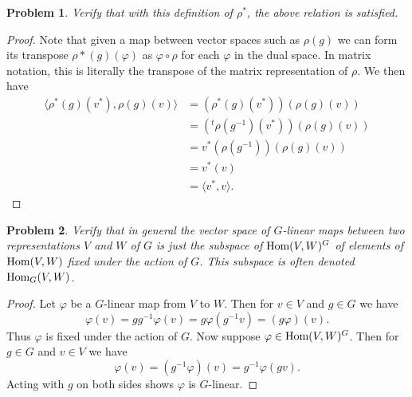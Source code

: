 \documentclass{article}
\newtheorem{problem}{Problem}
\renewcommand{\hom}{\textup{Hom}}
\begin{document}
\begin{problem}
Verify that with this definition of $\rho^*$, the above relation is satisfied.
\end{problem}
\begin{proof}
Note that given a map between vector spaces such as $\rho(g)$ we can form its transpose $\rho*(g)(\varphi)$ as $\varphi \circ \rho$ for each $\varphi$ in the dual space. In matrix notation, this is literally the transpose of the matrix representation of $\rho$. We then have
\begin{align*}
\langle \rho^*(g)(v^*), \rho(g)(v) \rangle
&= (\rho^*(g)(v^*))(\rho(g)(v))\\
&= (^t\rho(g^{-1})(v^*))(\rho(g)(v))\\
&= v^*(\rho(g^{-1}))(\rho(g)(v))\\
&= v^*(v)\\
&= \langle v^*, v \rangle.
\end{align*}
\end{proof}

\begin{problem}
Verify that in general the vector space of $G$-linear maps between two representations $V$ and $W$ of $G$ is just the subspace of $\hom(V,W)^G$ of elements of $\hom(V,W)$ fixed under the action of $G$. This subspace is often denoted $\hom_G(V,W)$.
\end{problem}
\begin{proof}
Let $\varphi$ be a $G$-linear map from $V$ to $W$. Then for $v \in V$ and $g \in G$ we have
\[
\varphi(v) = gg^{-1}\varphi(v) = g \varphi(g^{-1}v) = (g\varphi)(v).
\]
Thus $\varphi$ is fixed under the action of $G$. Now suppose $\varphi \in \hom(V,W)^G$. Then for $g \in G$ and $v \in V$ we have
\[
\varphi(v) = (g^{-1}\varphi)(v) = g^{-1} \varphi(g v).
\]
Acting with $g$ on both sides shows $\varphi$ is $G$-linear.
\end{proof}
\end{document}
